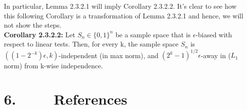 \documentclass[a4paper, english]{paper}
\begin{document}
 In particular, Lemma 2.3.2.1 will imply Corollary 2.3.2.2. It's clear to see how this following Corollary is a transformation of Lemma 2.3.2.1 and hence, we will not show the steps. \\
	
	\noindent\textbf{Corollary 2.3.2.2:} Let $S_n \in \{0, 1\}^n$ be a sample space that is $\epsilon$-biased with respect to linear tests. Then, for every k, the sample space $S_n$ is $((1-2^{-k})\epsilon, k)$-independent (in max norm), and $(2^k-1)^{1/2}\epsilon$-away  in ($L_1$ norm) from k-wise independence. \\

	\newpage
	\section{6. $\qquad$ References}
\end{document}
